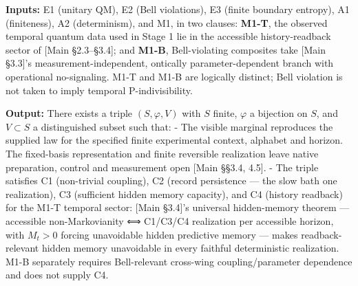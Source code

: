 \documentclass[
]{article}
\begin{document}
\textbf{Inputs:} E1 (unitary QM), E2 (Bell violations), E3 (finite
boundary entropy), A1 (finiteness), A2 (determinism), and M1, in two
clauses: \textbf{M1-T}, the observed temporal quantum data used in Stage
1 lie in the accessible history-readback sector of {[}Main
§2.3--§3.4{]}; and \textbf{M1-B}, Bell-violating composites take {[}Main
§3.3{]}'s measurement-independent, ontically parameter-dependent branch
with operational no-signaling. M1-T and M1-B are logically distinct;
Bell violation is not taken to imply temporal P-indivisibility.

\textbf{Output:} There exists a triple \((S, \varphi, V)\) with \(S\)
finite, \(\varphi\) a bijection on \(S\), and \(V \subset S\) a
distinguished subset such that: - The visible marginal reproduces the
supplied law for the specified finite experimental context, alphabet and
horizon. The fixed-basis representation and finite reversible
realization leave native preparation, control and measurement open
{[}Main §§3.4, 4.5{]}. - The triple satisfies C1 (non-trivial coupling),
C2 (record persistence --- the slow bath one realization), C3
(sufficient hidden memory capacity), and C4 (history readback) for the
M1-T temporal sector: {[}Main §3.4{]}'s universal hidden-memory theorem
--- accessible non-Markovianity ⟺ C1/C3/C4 realization per accessible
horizon, with \(M_t > 0\) forcing unavoidable hidden predictive memory
--- makes readback-relevant hidden memory unavoidable in every faithful
deterministic realization. M1-B separately requires Bell-relevant
cross-wing coupling/parameter dependence and does not supply C4.
\end{document}
